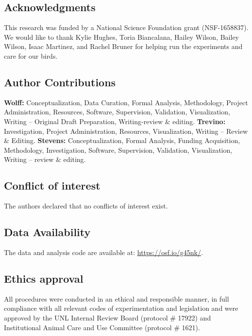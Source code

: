 \documentclass[
  ,doc,floatsintext]{apa6}
\begin{document}
\hypertarget{acknowledgments}{%
\subsection{Acknowledgments}\label{acknowledgments}}

This research was funded by a National Science Foundation grant (NSF-1658837). We would like to thank Kylie Hughes, Toria Biancalana, Hailey Wilson, Bailey Wilson, Isaac Martinez, and Rachel Bruner for helping run the experiments and care for our birds.

\hypertarget{author-contributions}{%
\subsection{Author Contributions}\label{author-contributions}}

\textbf{Wolff:} Conceptualization, Data Curation, Formal Analysis, Methodology, Project Administration, Resources, Software, Supervision, Validation, Visualization, Writing -- Original Draft Preparation, Writing-review \& editing. \textbf{Trevino:} Investigation, Project Administration, Resources, Visualization, Writing -- Review \& Editing. \textbf{Stevens:} Conceptualization, Formal Analysis, Funding Acquisition, Methodology, Investigation, Software, Supervision, Validation, Visualization, Writing -- review \& editing.

\hypertarget{conflict-of-interest}{%
\subsection{Conflict of interest}\label{conflict-of-interest}}

The authors declared that no conflicts of interest exist.

\hypertarget{data-availability}{%
\subsection{Data Availability}\label{data-availability}}

The data and analysis code are available at: \url{https://osf.io/g45nk/}.

\hypertarget{ethics-approval}{%
\subsection{Ethics approval}\label{ethics-approval}}

All procedures were conducted in an ethical and responsible manner, in full compliance with all relevant codes of experimentation and legislation and were approved by the UNL Internal Review Board (protocol \# 17922) and Institutional Animal Care and Use Committee (protocol \# 1621).
\end{document}
